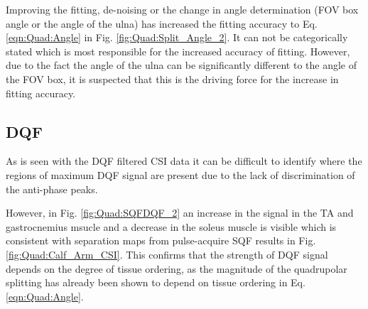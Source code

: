 
Improving the fitting, de-noising  or the change in angle determination (\ac{FOV} box angle or the angle of the ulna) has increased the fitting accuracy to Eq. \ref{eqn:Quad:Angle} in Fig. \ref{fig:Quad:Split_Angle_2}. It can not be categorically stated which is most responsible for the increased accuracy of fitting. However, due to the fact the angle of the ulna can be significantly different to the angle of the \ac{FOV} box, it is suspected that this is the driving force for the increase in fitting accuracy.

\subsection{DQF}

As is seen with the \ac{DQF} filtered \ac{CSI} data it can be difficult to identify where the regions of maximum \ac{DQF} signal are present due to the lack of discrimination of the anti-phase peaks. 

However, in Fig. \ref{fig:Quad:SQFDQF_2} an increase in the signal in the \ac{TA} and gastrocnemius msucle and a decrease in the soleus muscle is visible which is consistent with separation maps from pulse-acquire \ac{SQF} results in Fig. \ref{fig:Quad:Calf_Arm_CSI}. This confirms that the strength of \ac{DQF} signal depends on the degree of tissue ordering, as the magnitude of the quadrupolar splitting has already been shown to depend on tissue ordering in Eq. \ref{eqn:Quad:Angle}. 




